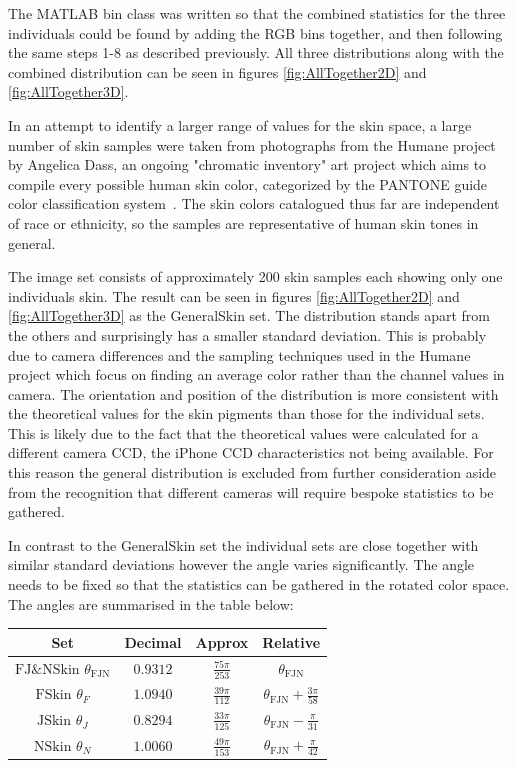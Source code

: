 The MATLAB bin class was written so that the combined statistics for the three individuals could be found by adding the RGB bins together, and then following the same steps 1-8 as described previously. All three distributions along with the combined distribution can be seen in figures \ref{fig:AllTogether2D} and \ref{fig:AllTogether3D}.


In an attempt to identify a larger range of values for the skin space, a large number of skin samples were taken from photographs from the Humane project by Angelica Dass, an ongoing "chromatic inventory" art project which aims to compile every possible human skin color, categorized by the PANTONE guide color classification system~\cite{Dass2012}. The skin colors catalogued thus far are independent of race or ethnicity, so the samples are representative of human skin tones in general.

The image set consists of approximately 200 skin samples  each showing only one individuals skin. The result can be seen in figures \ref{fig:AllTogether2D} and \ref{fig:AllTogether3D} as the GeneralSkin set. The distribution stands apart from the others and surprisingly has a smaller standard deviation. This is probably due to camera differences and the sampling techniques used in the Humane project which focus on finding an average color rather than the channel values in camera. The orientation and position of the distribution is more consistent with the theoretical values for the skin pigments than those for the individual sets. This is likely due to the fact that the theoretical values were calculated for a different camera CCD, the iPhone CCD characteristics not being available. For this reason the general distribution is excluded from further consideration aside from the recognition that different cameras will require bespoke statistics to be gathered. 

In contrast to the GeneralSkin set the individual sets are close together with similar standard deviations however the angle varies significantly. The angle needs to be fixed so that the statistics can be gathered in the rotated color space. The angles are summarised in the table below:

\begin{tabular}{|c|c|c|c|}
\hline   Set                                                             & Decimal   & Approx                       & Relative \\ 
\hline   $\text{FJ$\&$NSkin }\theta _{\text{FJN}}$ & $0.9312$ & $\frac{75 \pi }{253}$ & $\theta _{\text{FJN}}$ \\
\hline   $\text{FSkin }\theta _F$                            & $1.0940$ & $\frac{39 \pi }{112}$ & $\theta _{\text{FJN}}+\frac{3 \pi }{58}$ \\
\hline   $\text{JSkin }\theta _J$                             & $0.8294$ & $\frac{33 \pi }{125}$ & $\theta _{\text{FJN}}-\frac{\pi }{31}$ \\
\hline   $\text{NSkin }\theta _N$                          & $1.0060$ & $\frac{49 \pi }{153}$ & $\theta _{\text{FJN}}+\frac{\pi }{42} $\\
\hline 
\end{tabular} 

